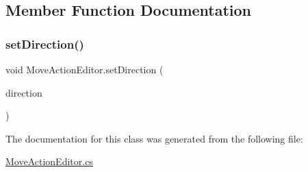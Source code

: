 \subsection{Member Function Documentation}
\mbox{\label{class_move_action_editor_a68dfb286dc1f7ea843b2916d12f0de26}} 
\subsubsection{\texorpdfstring{set\+Direction()}{setDirection()}}
{\footnotesize\ttfamily void Move\+Action\+Editor.\+set\+Direction (\begin{DoxyParamCaption}\item[{\mbox{\hyperlink{_move_action_8cs_a9e4683fdca765fb08e2d0e5f7f57c162}{move\+Dir}}}]{direction }\end{DoxyParamCaption})}



The documentation for this class was generated from the following file\+:\begin{DoxyCompactItemize}
\item 
\mbox{\hyperlink{_move_action_editor_8cs}{Move\+Action\+Editor.\+cs}}\end{DoxyCompactItemize}
